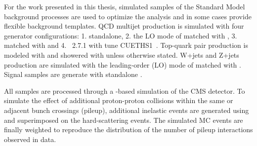 For the work presented in this thesis, simulated samples of the Standard Model background processes are used to optimize the analysis and in some cases provide flexible background templates. QCD multijet production is simulated with four generator configurations: 1. \PYTHIA standalone, 2. the LO mode of \MADGRAPH matched with \PYTHIA, 3. \POWHEG matched with \PYTHIA and 4. \HERWIG{++}~2.7.1 with tune CUETHS1~\cite{Khachatryan:2015pea}. Top-quark pair production is modeled with \POWHEG and showered with \PYTHIA unless otherwise stated. W+jets and Z+jets production are simulated with the leading-order (LO) mode of \MADGRAPH matched with \PYTHIA. Signal samples are generate with standalone \PYTHIA.

All samples are processed through a \GEANTfour-based simulation of the CMS detector. To simulate the effect of additional proton-proton collisions within the same or adjacent bunch crossings (pileup), additional inelastic events are generated using \PYTHIA and superimposed on the hard-scattering events. The simulated MC events are finally weighted to reproduce the distribution of the number of pileup interactions observed in data.
